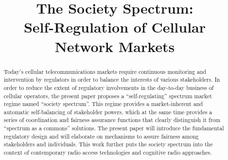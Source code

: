 \documentclass[conference]{IEEEtran}
\begin{document}
\title{The Society Spectrum:\\ Self-Regulation of Cellular Network Markets}

\author{
     
  }














\maketitle


\begin{abstract}




Today’s cellular telecommunications markets require continuous monitoring and intervention by regulators in order to balance the interests of various stakeholders.  In order to reduce the extent of regulatory involvements in the day-to-day business of cellular operators, the present paper proposes a ``self-regulating'' spectrum market regime named ``society spectrum''. This regime provides a market-inherent and automatic self-balancing of stakeholder powers, which at the same time provides a series of coordination and fairness assurance functions that clearly distinguish it from ``spectrum as a commons'' solutions. The present paper will introduce the fundamental regulatory design and will elaborate on mechanisms to assure fairness among stakeholders and individuals. This work further puts the society spectrum into the context of contemporary radio access technologies and cognitive radio approaches.








\end{abstract}
\end{document}
